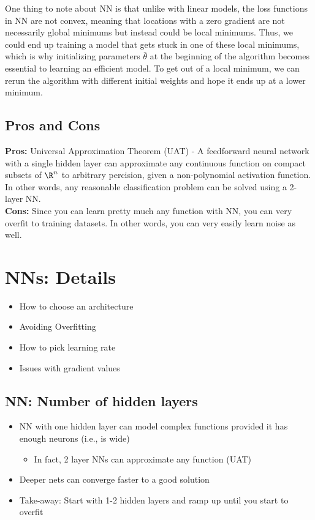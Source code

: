 \documentclass[12pt]{article}
\begin{document}
One thing to note about NN is that unlike with linear models, the loss functions in NN are not convex, meaning that locations with a zero gradient are not necessarily global minimums but instead could be local minimums. Thus, we could end up training a model that gets stuck in one of these local minimums, which is why initializing parameters $\bar{\theta}$ at the beginning of the algorithm becomes essential to learning an efficient model. To get out of a local minimum, we can rerun the algorithm with different initial weights and hope it ends up at a lower minimum.

\subsection{Pros and Cons}

\textbf{Pros:} Universal Approximation Theorem (UAT) - A feedforward neural network with a single hidden layer can approximate any continuous function on compact subsets of $\R^n$ to arbitrary percision, given a non-polynomial activation function. In other words, any reasonable classification problem can be solved using a 2-layer NN.\\

\textbf{Cons:} Since you can learn pretty much any function with NN, you can very overfit to training datasets. In other words, you can very easily learn noise as well.

\section{NNs: Details}

\begin{itemize}
	\item How to choose an architecture
	\item Avoiding Overfitting
	\item How to pick learning rate
	\item Issues with gradient values
\end{itemize}

\subsection{NN: Number of hidden layers}

\begin{itemize}
	\item NN with one hidden layer can model complex functions provided it has enough neurons (i.e., is wide)
		\begin{itemize}
			\item In fact, 2 layer NNs can approximate any function (UAT)
		\end{itemize}
	\item Deeper nets can converge faster to a good solution
	\item Take-away: Start with 1-2 hidden layers and ramp up until you start to overfit
\end{itemize}
\end{document}
